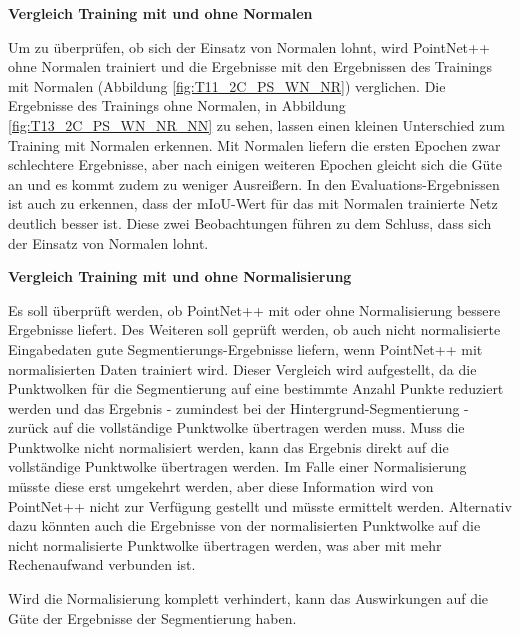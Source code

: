 \documentclass[12pt,titlepage, twoside]{article}
\begin{document}
\textbf{Vergleich Training mit und ohne Normalen}

Um zu überprüfen, ob sich der Einsatz von Normalen lohnt, wird PointNet++ ohne Normalen trainiert und die Ergebnisse mit den Ergebnissen des Trainings mit Normalen (Abbildung \ref{fig:T11_2C_PS_WN_NR}) verglichen. 
Die Ergebnisse des Trainings ohne Normalen, in Abbildung \ref{fig:T13_2C_PS_WN_NR_NN} zu sehen, lassen einen kleinen Unterschied zum Training mit Normalen erkennen. 
Mit Normalen liefern die ersten Epochen zwar schlechtere Ergebnisse, aber nach einigen weiteren Epochen gleicht sich die Güte an und es kommt zudem zu weniger Ausreißern. 
In den Evaluations-Ergebnissen ist auch zu erkennen, dass der mIoU-Wert für das mit Normalen trainierte Netz deutlich besser ist. 
Diese zwei Beobachtungen führen zu dem Schluss, dass sich der Einsatz von Normalen lohnt.

\textbf{Vergleich Training mit und ohne Normalisierung} 

Es soll überprüft werden, ob PointNet++ mit oder ohne Normalisierung bessere Ergebnisse liefert. 
Des Weiteren soll geprüft werden, ob auch nicht normalisierte Eingabedaten gute Segmentierungs-Ergebnisse liefern, wenn PointNet++ mit normalisierten Daten trainiert wird.
Dieser Vergleich wird aufgestellt, da die Punktwolken für die Segmentierung auf eine bestimmte Anzahl Punkte reduziert werden und das Ergebnis - zumindest bei der Hintergrund-Segmentierung - 
zurück auf die vollständige Punktwolke übertragen werden muss.
Muss die Punktwolke nicht normalisiert werden, kann das Ergebnis direkt auf die vollständige Punktwolke übertragen werden. 
Im Falle einer Normalisierung müsste diese erst umgekehrt werden, aber diese Information wird von PointNet++ nicht zur Verfügung gestellt und müsste ermittelt werden.
Alternativ dazu könnten auch die Ergebnisse von der normalisierten Punktwolke auf die nicht normalisierte Punktwolke übertragen werden, was aber mit mehr Rechenaufwand verbunden ist.

Wird die Normalisierung komplett verhindert, kann das Auswirkungen auf die Güte der Ergebnisse der Segmentierung haben.
\end{document}
